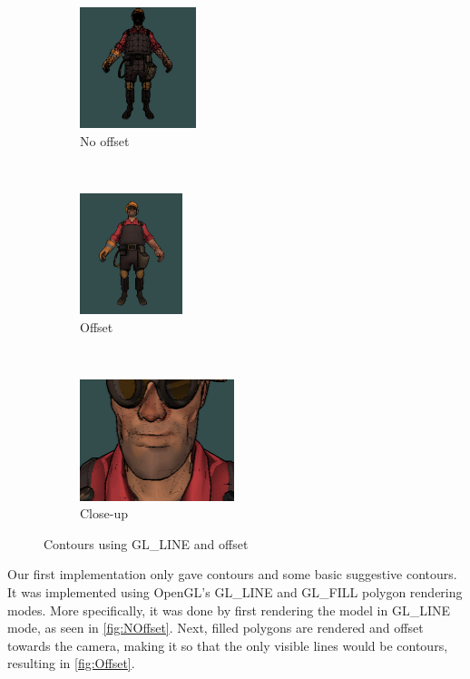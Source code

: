 \begin{figure}[h]
    \centering
        \begin{subfigure}[b]{0.3\textwidth}
        \centering
        \includegraphics[height=100pt]{img/ModelA.png}
        \caption{No offset}
        \label{fig:NOffset}
    \end{subfigure}
    ~
        \begin{subfigure}[b]{0.3\textwidth}
        \centering
        \includegraphics[height=100pt]{img/ModelB.png}
        \caption{Offset}
        \label{fig:Offset}
    \end{subfigure}
    ~
        \begin{subfigure}[b]{0.3\textwidth}
        \centering
        \includegraphics[height=100pt]{img/ModelC.png}
        \caption{Close-up}
        \label{fig:ZOffset}
    \end{subfigure}
    \caption{Contours using GL\_LINE and offset}
    \label{fig:ZOffset}
    \end{figure}

Our first implementation only gave contours and some basic suggestive contours. It was implemented using OpenGL's
GL\_LINE and GL\_FILL polygon rendering modes. More specifically, it was done by first rendering the model in GL\_LINE mode, as 
seen in \autoref{fig:NOffset}. Next, filled polygons are rendered and offset towards 
the camera, making it so that the only visible lines would be contours, resulting in \autoref{fig:Offset}.

